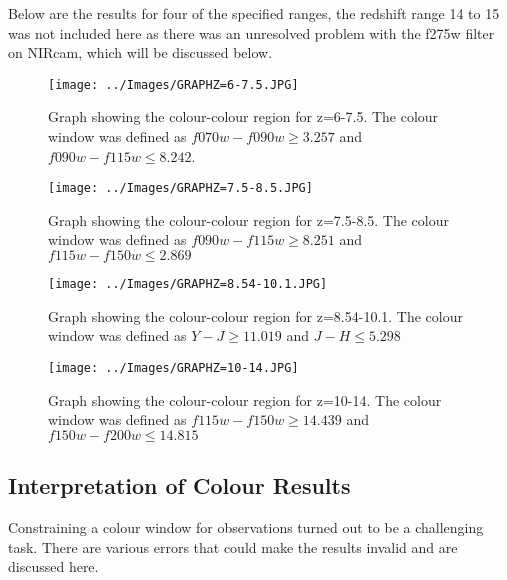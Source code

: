Below are the results for four of the specified ranges, the redshift range 14 to 15 was not included here as there was an unresolved problem with the f275w filter on NIRcam, which will be discussed below.

\begin{figure}
				\centering
				\texttt{[image: ../Images/GRAPHZ=6-7.5.JPG]}
				\caption{Graph showing the colour-colour region for z=6-7.5. The colour window was defined as $f070w-f090w{\ge}3.257$ and $f090w-f115w{\le}8.242$.\label{fig:col1}}
			\end{figure}

\begin{figure}
				\centering
				\texttt{[image: ../Images/GRAPHZ=7.5-8.5.JPG]}
				\caption{Graph showing the colour-colour region for z=7.5-8.5. The colour window was defined as $f090w-f115w{\ge}8.251$ and $f115w-f150w{\le}2.869$\label{fig:col2}}
			\end{figure}

\begin{figure}
				\centering
				\texttt{[image: ../Images/GRAPHZ=8.54-10.1.JPG]}
				\caption{Graph showing the colour-colour region for z=8.54-10.1. The colour window was defined as $Y-J{\ge}11.019$ and $J-H{\le}5.298$\label{fig:col3}}
			\end{figure}

\begin{figure}
				\centering
				\texttt{[image: ../Images/GRAPHZ=10-14.JPG]}
				\caption{Graph showing the colour-colour region for z=10-14. The colour window was defined as $f115w-f150w{\ge}14.439$ and $f150w-f200w{\le}14.815$\label{fig:col4}}
			\end{figure}
\subsection{Interpretation of Colour Results}
       \label{sub:Interp_Colour}

Constraining a colour window for observations turned out to be a challenging task. There are various errors that could make the results invalid and are discussed here.


